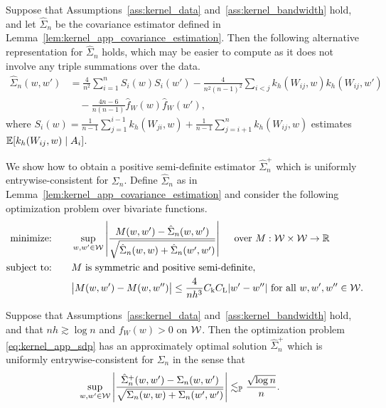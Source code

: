 \begin{lemma}
  \label{lem:kernel_app_alternative_covariance_estimator}

  Suppose that Assumptions~\ref{ass:kernel_data}
  and~\ref{ass:kernel_bandwidth} hold,
  and let $\hat \Sigma_n$
  be the covariance estimator defined
  in Lemma~\ref{lem:kernel_app_covariance_estimation}.
  Then the following alternative representation
  for $\hat \Sigma_n$ holds,
  which may be easier to compute
  as it does not involve any triple summations
  over the data.
  \begin{align*}
    \hat \Sigma_n(w,w')
    &=
    \frac{4}{n^2}
    \sum_{i=1}^n
    S_i(w) S_i(w')
    - \frac{4}{n^2(n-1)^2}
    \sum_{i<j}
    k_h(W_{i j},w)
    k_h(W_{i j},w') \\
    &\quad-
    \frac{4n-6}{n(n-1)}
    \hat f_W(w)
    \hat f_W(w'),
  \end{align*}
  where
  $S_i(w) = \frac{1}{n-1}
  \sum_{j = 1}^{i-1} k_h(W_{j i}, w)
  + \frac{1}{n-1} \sum_{j = i+1}^n k_h(W_{i j}, w)$
  estimates $\mathbb{E}[k_h(W_{i j},w) \mid A_i]$.

\end{lemma}

We show how to obtain a positive semi-definite estimator $\hat \Sigma_n^+$
which is uniformly entrywise-consistent for $\Sigma_n$. Define $\hat \Sigma_n$
as in Lemma~\ref{lem:kernel_app_covariance_estimation} and consider the
following
optimization problem over bivariate functions.
%
\begin{equation}
  \label{eq:kernel_app_sdp}
  \begin{aligned}
    \operatorname*{minimize:}
    \qquad
    & \sup_{w,w' \in \mathcal{W}}
    \left|
    \frac{M(w,w') - \hat\Sigma_n(w,w')}
    {\sqrt{\hat \Sigma_n(w,w) + \hat \Sigma_n(w',w')}}
    \right|
    \quad \textup{ over } M: \mathcal{W} \times \mathcal{W} \to \mathbb{R}
    \\
    \operatorname*{subject\ to:}
    \qquad
    & M \textup{ is symmetric and positive semi-definite}, \\
    & \big|M(w,w') - M(w, w'')\big|
    \leq \frac{4}{n h^3}
    C_{\mathrm{k}} C_{\mathrm{L}}
    |w'-w''|
    \textup{ for all }
    w, w', w'' \in \mathcal{W}.
  \end{aligned}
\end{equation}

\begin{lemma}
  \label{lem:kernel_app_sdp}

  Suppose that Assumptions~\ref{ass:kernel_data}
  and~\ref{ass:kernel_bandwidth} hold, and that
  $n h \gtrsim \log n$ and $f_W(w) > 0$ on $\mathcal{W}$.
  Then the optimization problem \eqref{eq:kernel_app_sdp}
  has an approximately optimal solution $\hat\Sigma_n^+$
  which is uniformly entrywise-consistent
  for $\Sigma_n$ in the sense that
  \begin{align*}
    \sup_{w,w' \in \mathcal{W}}
    \left|
    \frac{\hat \Sigma_n^+(w,w') - \Sigma_n(w,w')}
    {\sqrt{\Sigma_n(w,w) + \Sigma_n(w',w')}}
    \right|
    &\lesssim_{\mathbb{P}}
    \frac{\sqrt{\log n}}{n}.
  \end{align*}

\end{lemma}

